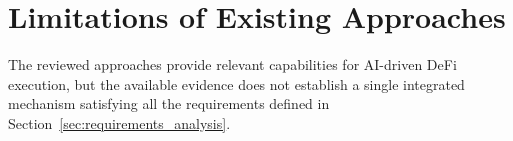 


\section{Limitations of Existing Approaches}
\label{sec:sota_limitations}

The reviewed approaches provide relevant capabilities for
AI-driven DeFi execution, but the available evidence does
not establish a single integrated mechanism satisfying all
the requirements defined in
Section~\ref{sec:requirements_analysis}.

